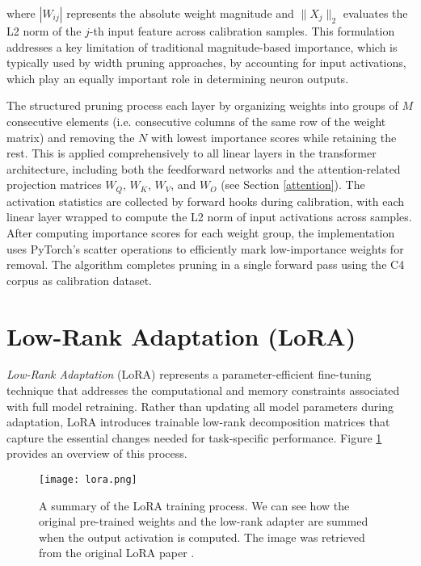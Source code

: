 where $|W_{ij}|$ represents the absolute weight magnitude and $\|X_j\|_2$ evaluates the L2 norm of the $j$-th input feature across calibration samples. This formulation addresses a key limitation of traditional magnitude-based importance, which is typically used by width pruning approaches, by accounting for input activations, which play an equally important role in determining neuron outputs.

The structured pruning process each layer by organizing weights into groups of $M$ consecutive elements (i.e. consecutive columns of the same row of the weight matrix) and removing the $N$ with lowest importance scores while retaining the rest. This is applied comprehensively to all linear layers in the transformer architecture, including both the feedforward networks and the attention-related projection matrices $W_Q$, $W_K$, $W_V$, and $W_O$ (see Section \ref{attention}). The activation statistics are collected by forward hooks during calibration, with each linear layer wrapped to compute the L2 norm of input activations across samples. After computing importance scores for each weight group, the implementation uses PyTorch's scatter operations to efficiently mark low-importance weights for removal. The algorithm completes pruning in a single forward pass using the C4 corpus \cite{c4} as calibration dataset.

\section{Low-Rank Adaptation (LoRA)} \label{lora}

\textit{Low-Rank Adaptation} (LoRA) \cite{lora} represents a parameter-efficient fine-tuning technique that addresses the computational and memory constraints associated with full model retraining. Rather than updating all model parameters during adaptation, LoRA introduces trainable low-rank decomposition matrices that capture the essential changes needed for task-specific performance. Figure \ref{fig:lora} provides an overview of this process.

\begin{figure}[htbp]
    \centering
    \texttt{[image: lora.png]}
    \caption[LoRA Overview]{A summary of the LoRA training process. We can see how the original pre-trained weights and the low-rank adapter are summed when the output activation is computed. The image was retrieved from the original LoRA paper \cite{lora}.}
    \label{fig:lora}
\end{figure}

